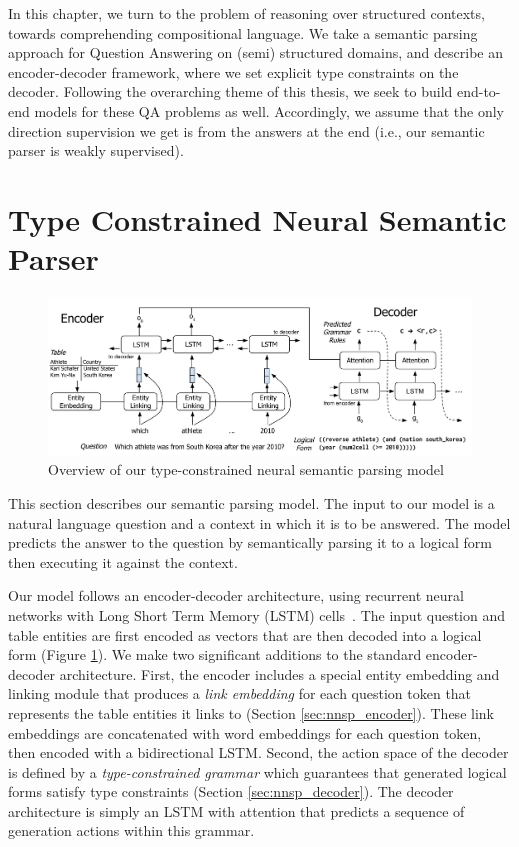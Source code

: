 In this chapter, we turn to the problem of reasoning over structured contexts, 
towards comprehending compositional language. We take a semantic parsing 
approach for Question Answering on (semi) structured
domains, and describe an encoder-decoder framework, where we set explicit type 
constraints on the decoder. Following the overarching theme of this thesis, we 
seek to build end-to-end models for these QA problems
as well. Accordingly, we assume that the only direction supervision we get is 
from the answers at the end (i.e., our semantic parser is weakly supervised).

\section{Type Constrained Neural Semantic Parser}
\begin{figure}
\centering
\includegraphics[width=6in]{figures/type_constrained_nnsp.png}
\caption{Overview of our type-constrained neural semantic parsing model}
\label{fig:nnsp_model}
\end{figure}

This section describes our semantic parsing model.
The input to our model is a natural language question and a context in which it 
is to be answered.
The model predicts the answer to the question by semantically parsing it to a 
logical form then executing it against the context.

Our model follows an encoder-decoder architecture, using recurrent neural 
networks with Long Short Term Memory (LSTM) cells~\citep{hochreiter1997long}. 
The input question and table entities are first encoded as vectors that are 
then decoded into a logical form (Figure \ref{fig:nnsp_model}).
We make two significant additions to the standard encoder-decoder architecture.
First, the encoder includes a special entity embedding and linking module that 
produces a \emph{link embedding} for each question token that represents the 
table entities it links to (Section \ref{sec:nnsp_encoder}).
These link embeddings are concatenated with word embeddings for each question 
token, then encoded with a bidirectional LSTM.
Second, the action space of the decoder is defined by a \emph{type-constrained 
grammar} which guarantees that generated logical forms satisfy type constraints 
(Section \ref{sec:nnsp_decoder}).
The decoder architecture is simply an LSTM with attention that predicts a 
sequence of generation actions within this grammar.

